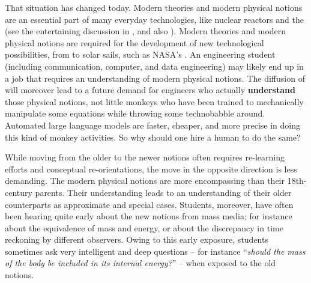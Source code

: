 %
That situation has changed today. Modern theories and modern physical notions are an essential part of many everyday technologies, like nuclear reactors and the  (see the entertaining discussion in \cites[Project~A]{tayloretal2000}, and also \cites{petitetal2005,fliegeletal1996,ashby2002,muelleretal2008}). Modern theories and modern physical notions are required for the development of new technological possibilities, from  to solar sails, such as NASA's . An engineering student (including communication, computer, and data engineering) may likely end up in a job that requires an understanding of modern physical notions. The diffusion of  will moreover lead to a future demand for engineers who actually \textbf{understand} those physical notions, not little monkeys who have been trained to mechanically manipulate some equations while throwing some technobabble around. Automated large language models are faster, cheaper, and more precise in doing this kind of monkey activities. So why should one hire a human to do the same?

While moving from the older to the newer notions often requires re-learning efforts and conceptual re-orientations, the move in the opposite direction is less demanding. The modern physical notions are more encompassing than their 18th-century parents. Their understanding leads to an understanding of their older counterparts as approximate and special cases. Students, moreover, have often been hearing quite early  about the new notions from mass media; for instance about the equivalence of mass and energy, or about the discrepancy in time reckoning by different observers. Owing to this early exposure, students sometimes ask very intelligent and deep questions -- for instance \enquote{\emph{should the mass of the body be included in its internal energy?}} -- when exposed to the old notions.



